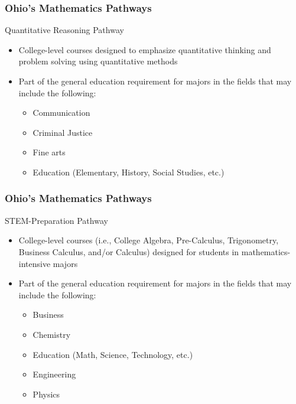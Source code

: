 \documentclass[14pt]{beamer}
\newlength{\myscalewidth}
\newcommand{\scaletowidth}[2]{%
\setlength{\myscalewidth}{\widthof{#2}}%
\pgfmathsetmacro{\myscaleratio}{#1/\myscalewidth}%
\scalebox{\myscaleratio}{#2}}
\newcounter{a}
\newcounter{b}
\begin{document}
\begin{frame}
  \frametitle{Ohio's Mathematics Pathways}
    Quantitative Reasoning Pathway %

    \begin{itemize}
    \item College-level courses designed to emphasize quantitative thinking and problem solving using quantitative methods
    \item Part of the general education requirement for majors in the fields that may include the following:
      \begin{itemize}
      \item Communication
      \item Criminal Justice
      \item Fine arts
      \item Education (Elementary, History, Social Studies, etc.)
      \end{itemize}
    \end{itemize}
\end{frame}

\begin{frame}
  \frametitle{Ohio's Mathematics Pathways}

     STEM-Preparation Pathway %

     \begin{itemize}
       \item College-level courses (i.e., College Algebra, Pre-Calculus, Trigonometry, Business Calculus, and/or Calculus) designed for students in mathematics-intensive majors
       \item Part of the general education requirement for majors in the fields that may include the following:
         \begin{itemize}
           \item Business			
           \item Chemistry
           \item Education (Math, Science, Technology, etc.)
           \item Engineering
           \item Physics
         \end{itemize}
     \end{itemize}
\end{frame}

\begin{frame}[nofills]
  \vfill
  \scaletowidth{\textwidth}{Thank You!}
  \vfill
\end{frame}
\end{document}
